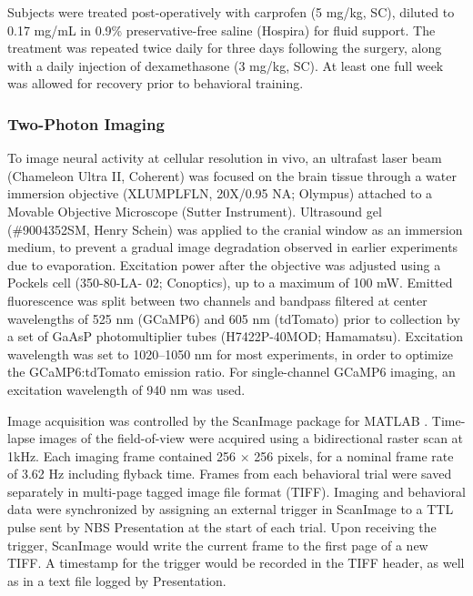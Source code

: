 Subjects were treated post-operatively with carprofen (5 mg/kg, SC), diluted to 0.17 mg/mL in 0.9\% preservative-free saline (Hospira) for fluid support. The treatment was repeated twice daily for three days following the surgery, along with a daily injection of dexamethasone (3 mg/kg, SC). At least one full week was allowed for recovery prior to behavioral training.

\subsubsection*{Two-Photon Imaging}
To image neural activity at cellular resolution in vivo, an ultrafast laser beam (Cha\-meleon Ultra II, Coherent) was focused on the brain tissue through a water immersion objective (XLUMPLFLN, 20X/0.95 NA; Olympus) attached to a Movable Objective Microscope (Sutter Instrument). Ultrasound gel (\#9004352SM, Henry Schein) was applied to the cranial window as an immersion medium, to prevent a gradual image degradation observed in earlier experiments due to evaporation.
Excitation power after the objective was adjusted using a Pockels cell (350-80-LA-
02; Conoptics), up to a maximum of 100 mW. Emitted fluorescence was split between two channels and bandpass filtered at center wavelengths of 525 nm (GCaMP6) and 605 nm (tdTomato) prior to collection by a set of GaAsP photomultiplier tubes (H7422P-40MOD; Hamamatsu). Excitation wavelength was set to 1020--1050 nm for most experiments, in order to optimize the GCaMP6:tdTomato emission ratio. For single-channel GCaMP6 imaging, an excitation wavelength of 940 nm was used.

Image acquisition was controlled by the ScanImage package for MATLAB \citep{pologruto03}. Time-lapse images of the field-of-view were acquired using a bidirectional raster scan at 1kHz. Each imaging frame contained 256 × 256 pixels, for a nominal frame rate of 3.62 Hz including flyback time. Frames from each behavioral trial were saved separately in multi-page tagged image file format (TIFF). Imaging and behavioral data were synchronized by assigning an external trigger in ScanImage to a TTL pulse sent by NBS Presentation at the start of each trial. Upon receiving the trigger, ScanImage would write the current frame to the first page of a new TIFF. A timestamp for the trigger would be recorded in the TIFF header, as well as in a text file logged by Presentation.        

